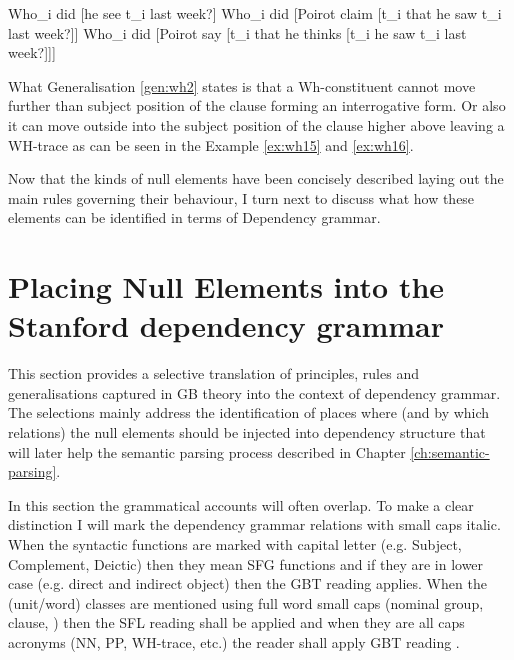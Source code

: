 \begin{exe}
	\ex\label{ex:wh14} Who_{i} did [he see t_{i} last week?]
	\ex\label{ex:wh15} Who_{i} did [Poirot claim [t_{i} that he saw t_{i} last week?]]
	\ex\label{ex:wh16} Who_{i} did [Poirot say [t_{i} that he thinks [t_{i} he saw t_{i} last week?]]]
\end{exe}

What Generalisation \ref{gen:wh2} states is that a Wh-constituent cannot move further than subject position of the clause forming an interrogative form. Or also it can move outside into the subject position of the clause higher above leaving a WH-trace as can be seen in the Example \ref{ex:wh15} and \ref{ex:wh16}.

Now that the kinds of null elements have been concisely described laying out the main rules governing their behaviour, I turn next to discuss what how these elements can be identified in terms of Dependency grammar. 

\section{Placing Null Elements into the Stanford dependency grammar}
\label{sec:placing-null-elements}

This section provides a selective translation of principles, rules and generalisations captured in GB theory into the context of dependency grammar. The selections mainly address the identification of places where (and by which relations) the null elements should be injected into dependency structure that will later help the semantic parsing process described in Chapter \ref{ch:semantic-parsing}. 

In this section the grammatical accounts will often overlap. To make a clear distinction I will mark the dependency grammar relations with small caps italic. When the syntactic functions are marked with capital letter (e.g. Subject, Complement, Deictic) then they mean SFG functions and if they are in lower case (e.g. direct and indirect object) then the GBT reading applies. When the (unit/word) classes are mentioned using full word small caps (nominal group, clause, ) then the SFL reading shall be applied and when they are all caps acronyms (NN, PP, WH-trace, etc.) the reader shall apply GBT reading .

